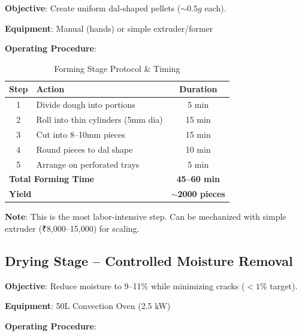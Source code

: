 \documentclass[12pt,a4paper]{article}
\begin{document}
\textbf{Objective}: Create uniform dal-shaped pellets ($\sim 0.5g$ each).

\textbf{Equipment}: Manual (hands) or simple extruder/former

\textbf{Operating Procedure}:

\begin{table}[h]
\centering
\begin{tabular}{clc}
\toprule
\textbf{Step} & \textbf{Action} & \textbf{Duration} \\
\midrule
1 & Divide dough into portions & 5 min \\
2 & Roll into thin cylinders (5mm dia) & 15 min \\
3 & Cut into 8--10mm pieces & 15 min \\
4 & Round pieces to dal shape & 10 min \\
5 & Arrange on perforated trays & 5 min \\
\midrule
\multicolumn{2}{l}{\textbf{Total Forming Time}} & \textbf{45--60 min} \\
\multicolumn{2}{l}{\textbf{Yield}} & \textbf{$\sim$2000 pieces} \\
\bottomrule
\end{tabular}
\caption{Forming Stage Protocol \& Timing}
\end{table}

\textbf{Note}: This is the most labor-intensive step. Can be mechanized with simple extruder (₹8,000--15,000) for scaling.

\subsection{Drying Stage -- Controlled Moisture Removal}

\textbf{Objective}: Reduce moisture to 9--11\% while minimizing cracks ($<1\%$ target).

\textbf{Equipment}: 50L Convection Oven (2.5 kW)

\textbf{Operating Procedure}:
\end{document}
